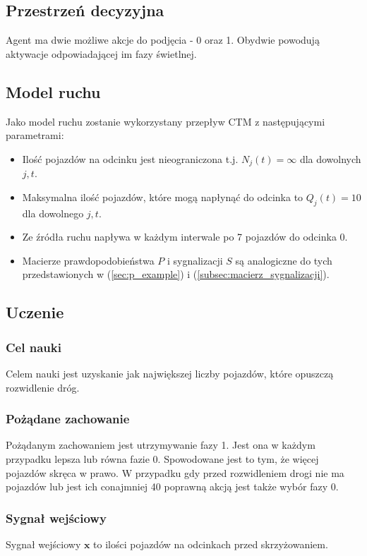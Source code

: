 \documentclass[12pt]{book}
\theoremstyle{plain}
\newcommand{\myref}[1]{(\ref{#1})}
\begin{document}
\subsection{Przestrzeń decyzyjna}
Agent ma dwie możliwe akcje do podjęcia - 0 oraz 1. Obydwie powodują aktywacje odpowiadającej im fazy świetlnej.

\subsection{Model ruchu}
Jako model ruchu zostanie wykorzystany przepływ CTM z następującymi parametrami:
\begin{itemize}
	\item Ilość pojazdów na odcinku jest nieograniczona t.j. $N_j(t)=\infty$ dla dowolnych $j,t$.
	\item Maksymalna ilość pojazdów, które mogą napłynąć do odcinka to $Q_j(t)=10$ dla dowolnego $j,t$.
	\item Ze źródła ruchu napływa w każdym interwale po 7 pojazdów do odcinka 0.
	\item Macierze prawdopodobieństwa $P$ i sygnalizacji $S$ są analogiczne do tych przedstawionych w \myref{sec:p_example} i \myref{subsec:macierz_sygnalizacji}.
\end{itemize}

\subsection{Uczenie}
\subsubsection*{Cel nauki}
Celem nauki jest uzyskanie jak największej liczby pojazdów, które opuszczą rozwidlenie dróg.
\subsubsection*{Pożądane zachowanie}
Pożądanym zachowaniem jest utrzymywanie fazy 1. Jest ona w każdym przypadku lepsza lub równa fazie 0. Spowodowane jest to tym, że więcej pojazdów skręca w prawo. W przypadku gdy przed rozwidleniem drogi nie ma pojazdów lub jest ich conajmniej 40 poprawną akcją jest także wybór fazy 0.
\subsubsection*{Sygnał wejściowy}
Sygnał wejściowy $\textbf{x}$ to ilości pojazdów na odcinkach przed skrzyżowaniem.
\end{document}
